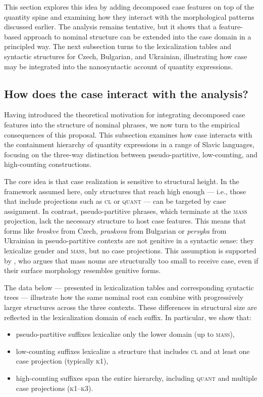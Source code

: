 \documentclass[output=paper,colorlinks,citecolor=brown
]{langscibook}
\begin{document}
This section explores this idea by adding decomposed case features on top of the quantity spine and examining how they interact with the morphological patterns discussed earlier. The analysis remains tentative, but it shows that a feature-based approach to nominal structure can be extended into the case domain in a principled way. The next subsection turns to the lexicalization tables and syntactic structures for Czech, Bulgarian, and Ukrainian, illustrating how case may be integrated into the nanosyntactic account of quantity expressions.

\subsection{How does the case interact with the analysis?}

Having introduced the theoretical motivation for integrating decomposed case features into the structure of nominal phrases, we now turn to the empirical consequences of this proposal. This subsection examines how case interacts with the containment hierarchy of quantity expressions in a range of Slavic languages, focusing on the three-way distinction between pseudo-partitive, low-counting, and high-counting constructions.

The core idea is that case realization is sensitive to structural height. In the framework assumed here, only structures that reach high enough — i.e., those that include projections such as \textsc{cl} or \textsc{quant} — can be targeted by case assignment. In contrast, pseudo-partitive phrases, which terminate at  the \textsc{mass} projection, lack the necessary structure to host case features. This means that forms like \textit{broskve} from Czech, \textit{praskova} from Bulgarian or \textit{persyka} from Ukrainian in pseudo-partitive contexts are not genitive in a syntactic sense: they lexicalize gender and \textsc{mass}, but no case projections. This assumption is supported by \citet{Caha2022}, who argues that mass nouns are structurally too small to receive case, even if their surface morphology resembles genitive forms.

The data below — presented in lexicalization tables and corresponding syntactic trees — illustrate how the same nominal root can combine with progressively larger structures across the three contexts. These differences in structural size are reflected in the lexicalization domain of each suffix. In particular, we show that:

\begin{itemize}
    \item pseudo-partitive suffixes lexicalize only the lower domain (up to \textsc{mass}),
    \item low-counting suffixes lexicalize a structure that includes \textsc{cl} and at least one case projection (typically \textsc{k1}),
    \item high-counting suffixes span the entire hierarchy, including \textsc{quant} and multiple case projections (\textsc{k1--k3}).
\end{itemize}
\end{document}
